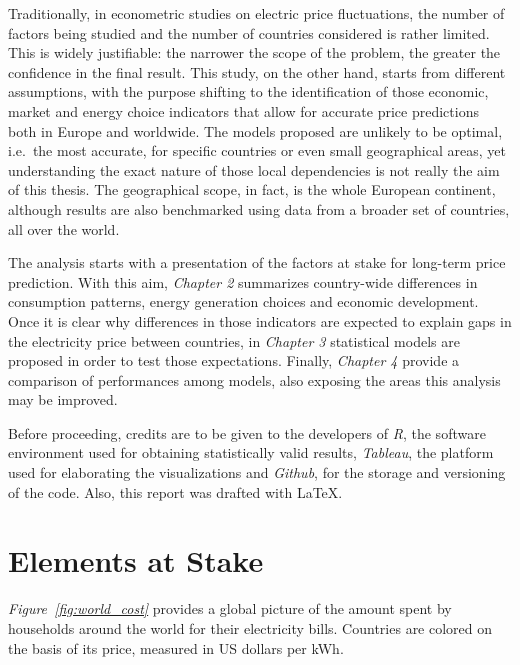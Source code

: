 \documentclass[a4paper,12pt]{book}
\begin{document}
Traditionally, in econometric studies on electric price fluctuations, the number of factors being studied and the number of countries considered is rather limited. This is widely justifiable: the narrower the scope of the problem, the greater the confidence in the final result. This study, on the other hand, starts from different assumptions, with the purpose shifting to the identification of those economic, market and energy choice indicators that allow for accurate price predictions both in Europe and worldwide. The models proposed are unlikely to be optimal, i.e.\ the most accurate, for specific countries or even small geographical areas, yet understanding the exact nature of those local dependencies is not really the aim of this thesis. The geographical scope, in fact, is the whole European continent, although results are also benchmarked using data from a broader set of countries, all over the world.

The analysis starts with a presentation of the factors at stake for long-term price prediction. With this aim, \textit{Chapter 2} summarizes country-wide differences in consumption patterns, energy generation choices and economic development. Once it is clear why differences in those indicators are expected to explain gaps in the electricity price between countries, in \textit{Chapter 3} statistical models are proposed in order to test those expectations. Finally, \textit{Chapter 4} provide a comparison of performances among models, also exposing the areas this analysis may be improved.

Before proceeding, credits are to be given to the developers of \textit{R}, the software environment used for obtaining statistically valid results, \textit{Tableau}, the platform used for elaborating the visualizations and \textit{Github}, for the storage and versioning of the code. Also, this report was drafted with \LaTeX.

\chapter{Elements at Stake}

\textit{Figure~\ref{fig:world_cost}} provides a global picture of the amount spent by households around the world for their electricity bills. Countries are colored on the basis of its price, measured in US dollars per kWh.
\end{document}
